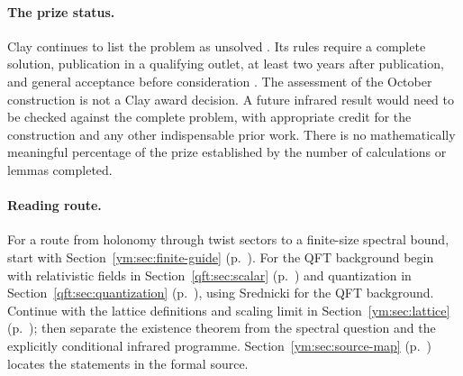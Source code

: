 \paragraph{The prize status.}
Clay continues to list the problem as unsolved \cite{ClayYMStatus2026}.
Its rules require a complete solution, publication in a qualifying outlet,
at least two years after publication, and general acceptance before
consideration \cite{ClayPrizeRules2018}. The assessment of the October
construction is not a Clay award decision. A future infrared result would
need to be checked against the complete problem, with appropriate credit
for the construction and any other indispensable prior work. There is no
mathematically meaningful percentage of the prize established by the
number of calculations or lemmas completed.

\paragraph{Reading route.}
For a route from holonomy through twist sectors to a finite-size spectral
bound, start with Section~\ref{ym:sec:finite-guide}
(p.~\pageref{ym:sec:finite-guide}). For the QFT background begin with
relativistic fields in Section~\ref{qft:sec:scalar}
(p.~\pageref{qft:sec:scalar}) and quantization in
Section~\ref{qft:sec:quantization}
(p.~\pageref{qft:sec:quantization}), using Srednicki
\cite{MSrednicki2007} for the QFT background. Continue with the lattice
definitions and scaling limit in Section~\ref{ym:sec:lattice}
(p.~\pageref{ym:sec:lattice}); then separate the existence theorem from
the spectral question and the explicitly conditional infrared programme.
Section~\ref{ym:sec:source-map}
(p.~\pageref{ym:sec:source-map}) locates the statements in the formal source.
\clearpage
